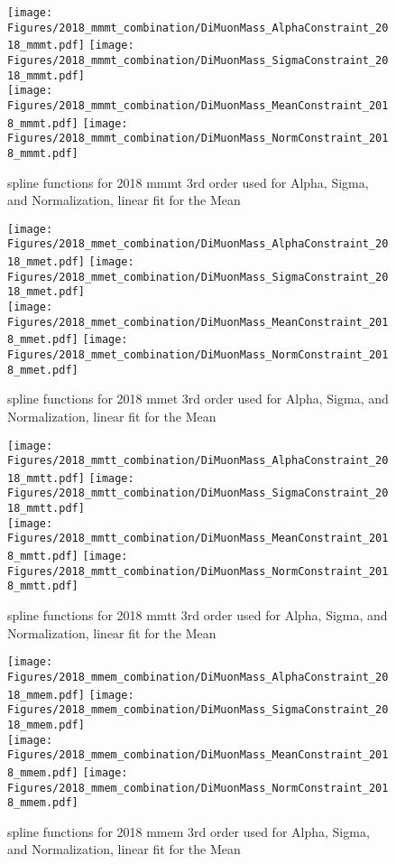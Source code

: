 \begin{figure}[ht!b]
    \centering 
    \texttt{[image: Figures/2018\_mmmt\_combination/DiMuonMass\_AlphaConstraint\_2018\_mmmt.pdf]}
    \texttt{[image: Figures/2018\_mmmt\_combination/DiMuonMass\_SigmaConstraint\_2018\_mmmt.pdf]}\\
    \texttt{[image: Figures/2018\_mmmt\_combination/DiMuonMass\_MeanConstraint\_2018\_mmmt.pdf]}
    \texttt{[image: Figures/2018\_mmmt\_combination/DiMuonMass\_NormConstraint\_2018\_mmmt.pdf]}\\
    \caption{\label{fig:spline_2018_mmmt} spline functions for 2018 mmmt 3rd order used for Alpha, Sigma, and Normalization, linear fit for the Mean}
\end{figure}
\begin{figure}[ht!b]
    \centering 
    \texttt{[image: Figures/2018\_mmet\_combination/DiMuonMass\_AlphaConstraint\_2018\_mmet.pdf]}
    \texttt{[image: Figures/2018\_mmet\_combination/DiMuonMass\_SigmaConstraint\_2018\_mmet.pdf]}\\
    \texttt{[image: Figures/2018\_mmet\_combination/DiMuonMass\_MeanConstraint\_2018\_mmet.pdf]}
    \texttt{[image: Figures/2018\_mmet\_combination/DiMuonMass\_NormConstraint\_2018\_mmet.pdf]}\\
    \caption{\label{fig:spline_2018_mmet} spline functions for 2018 mmet 3rd order used for Alpha, Sigma, and Normalization, linear fit for the Mean}
\end{figure}
\begin{figure}[ht!b]
    \centering 
    \texttt{[image: Figures/2018\_mmtt\_combination/DiMuonMass\_AlphaConstraint\_2018\_mmtt.pdf]}
    \texttt{[image: Figures/2018\_mmtt\_combination/DiMuonMass\_SigmaConstraint\_2018\_mmtt.pdf]}\\
    \texttt{[image: Figures/2018\_mmtt\_combination/DiMuonMass\_MeanConstraint\_2018\_mmtt.pdf]}
    \texttt{[image: Figures/2018\_mmtt\_combination/DiMuonMass\_NormConstraint\_2018\_mmtt.pdf]}\\
    \caption{\label{fig:spline_2018_mmtt} spline functions for 2018 mmtt 3rd order used for Alpha, Sigma, and Normalization, linear fit for the Mean}
\end{figure}
\begin{figure}[ht!b]
    \centering 
    \texttt{[image: Figures/2018\_mmem\_combination/DiMuonMass\_AlphaConstraint\_2018\_mmem.pdf]}
    \texttt{[image: Figures/2018\_mmem\_combination/DiMuonMass\_SigmaConstraint\_2018\_mmem.pdf]}\\
    \texttt{[image: Figures/2018\_mmem\_combination/DiMuonMass\_MeanConstraint\_2018\_mmem.pdf]}
    \texttt{[image: Figures/2018\_mmem\_combination/DiMuonMass\_NormConstraint\_2018\_mmem.pdf]}\\
    \caption{\label{fig:spline_2018_mmem} spline functions for 2018 mmem 3rd order used for Alpha, Sigma, and Normalization, linear fit for the Mean}
\end{figure}

